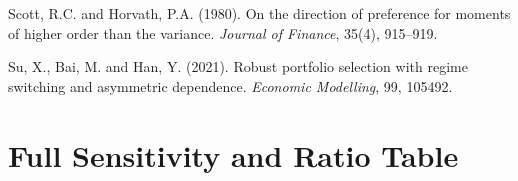 \documentclass[12pt, a4paper]{article}
\begin{document}
\begin{description}[leftmargin=2em, itemsep=2pt]
\item Scott, R.C. and Horvath, P.A. (1980). On the direction of preference for moments of
  higher order than the variance. \textit{Journal of Finance}, 35(4), 915--919.

\item Su, X., Bai, M. and Han, Y. (2021). Robust portfolio selection with regime switching
  and asymmetric dependence. \textit{Economic Modelling}, 99, 105492.

\end{description}

\appendix
\clearpage
\section{Full Sensitivity and Ratio Table}
\label{sec:appendix}
\end{document}
